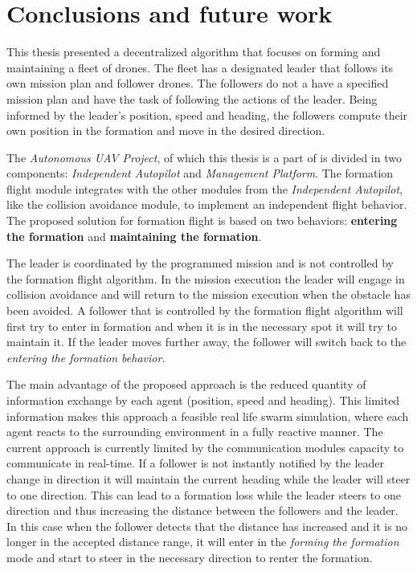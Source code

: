 \chapter{Conclusions and future work}
\label{chapter:conclusionfw}
This thesis presented a decentralized algorithm that focuses on forming and maintaining
a fleet of drones. The fleet has a designated leader that follows its own mission
plan and follower drones. The followers do not a have a specified mission plan 
and have the task of following the actions of the leader. Being informed
by the leader's position, speed and heading,  the followers compute their own
position in the formation and move in the desired direction. 

The \textit{Autonomous UAV Project}, of which this thesis is a part of is divided
in two components: \textit{Independent Autopilot} and \textit{Management Platform}.
The formation flight module integrates with the other modules from the \textit{
Independent Autopilot}, like the collision avoidance module, to implement an 
independent flight behavior. The proposed solution for formation flight is
based on two behaviors: \textbf{entering the formation} and \textbf{maintaining
the formation}.

The leader is coordinated by the programmed mission and is not controlled
by the formation flight algorithm. In the mission execution the leader will
engage in collision avoidance and will return to the mission execution when
the obstacle has been avoided. A follower that is controlled by the formation
flight algorithm will first try to enter in formation and when it is in the
necessary spot it will try to maintain it. If the leader moves further away, 
the follower will switch back to the \textit{entering the formation behavior}.

The main advantage of the proposed approach is the reduced quantity of information
exchange by each agent (position, speed and heading). This limited information
makes this approach a feasible real life swarm simulation, where each agent
reacts to the surrounding environment in a fully reactive manner. The current
approach is currently limited by the communication modules capacity to communicate
in real-time. If a follower is not instantly notified by the leader change in 
direction it will maintain the current heading while the leader will steer to one
direction. This can lead to a formation loss while the leader steers to one direction
and thus increasing the distance between the followers and the leader. In this
case when the follower detects that the distance has increased and it is no longer
in the accepted distance range, it will enter in the \textit{forming the formation}
mode and start to steer in the necessary direction to renter the formation.

